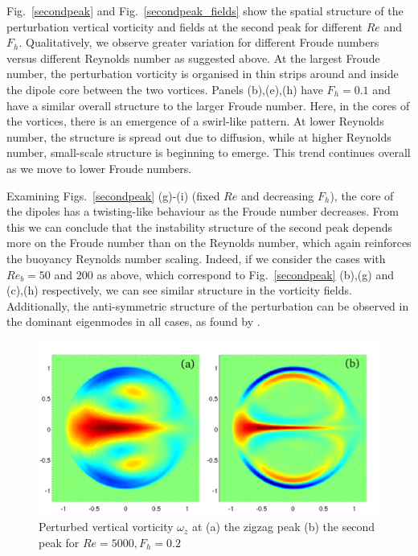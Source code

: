 Fig.~\ref{secondpeak} and Fig.~\ref{secondpeak_fields} show the spatial structure of the perturbation vertical vorticity and fields at the second peak for different $Re$ and $F_{h}$. Qualitatively, we observe greater variation for different Froude numbers versus different Reynolds number as suggested above.  At the largest Froude number, the perturbation vorticity is organised in thin strips around and inside the dipole core between the two vortices. Panels (b),(e),(h) have $F_{h}=0.1$ and have a similar overall structure to the larger Froude number. Here, in the cores of the vortices, there is an emergence of a swirl-like pattern. At lower Reynolds number, the structure is spread out due to diffusion, while at higher Reynolds number, small-scale structure is beginning to emerge. This trend continues overall as we move to lower Froude numbers. 

Examining Figs.~\ref{secondpeak} (g)-(i) (fixed $Re$ and decreasing $F_{h}$), the core of the dipoles has a twisting-like behaviour as the Froude number decreases. From this we can conclude that the instability structure of the second peak depends more on the Froude number than on the Reynolds number, which again reinforces the buoyancy Reynolds number scaling.  Indeed, if we consider the cases with $Re_{b}=50$ and $200$ as above, which correspond to Fig.~\ref{secondpeak} (b),(g) and (c),(h) respectively, we can see similar structure in the vorticity fields. Additionally, the anti-symmetric structure of the perturbation can be observed in the dominant eigenmodes in all cases, as found by \cite{bc1999,bc2000c}.

\begin{figure}
\begin{center}
\includegraphics[scale=0.5]{second_peak_vs_zigzag}
\caption{Perturbed vertical vorticity $\omega_{z}$ at (a) the zigzag peak (b) the second peak for $Re=5000, F_{h}=0.2$}
\label{zigzagcomparison}
\end{center}
\end{figure}

